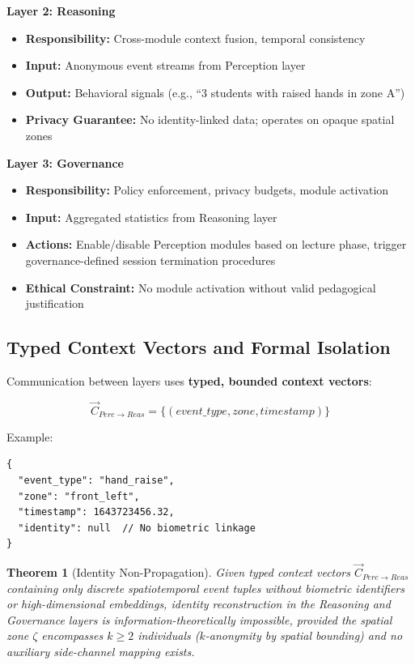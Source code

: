 \documentclass[conference]{IEEEtran}
\newtheorem{theorem}{Theorem}
\begin{document}
\textbf{Layer 2: Reasoning}
\begin{itemize}
    \item \textbf{Responsibility:} Cross-module context fusion, temporal consistency
    \item \textbf{Input:} Anonymous event streams from Perception layer
    \item \textbf{Output:} Behavioral signals (e.g., ``3 students with raised hands in zone A'')
    \item \textbf{Privacy Guarantee:} No identity-linked data; operates on opaque spatial zones
\end{itemize}

\textbf{Layer 3: Governance}
\begin{itemize}
    \item \textbf{Responsibility:} Policy enforcement, privacy budgets, module activation
    \item \textbf{Input:} Aggregated statistics from Reasoning layer
    \item \textbf{Actions:} Enable/disable Perception modules based on lecture phase, trigger governance-defined session termination procedures
    \item \textbf{Ethical Constraint:} No module activation without valid pedagogical justification
\end{itemize}

\subsection{Typed Context Vectors and Formal Isolation}
Communication between layers uses \textbf{typed, bounded context vectors}:

\begin{equation}
\vec{C}_{Perc \to Reas} = \{(event\_type, zone, timestamp)\}
\end{equation}

Example:
\begin{verbatim}
{
  "event_type": "hand_raise",
  "zone": "front_left",
  "timestamp": 1643723456.32,
  "identity": null  // No biometric linkage
}
\end{verbatim}

\begin{theorem}[Identity Non-Propagation]
Given typed context vectors $\vec{C}_{Perc \to Reas}$ containing only discrete spatiotemporal event tuples without biometric identifiers or high-dimensional embeddings, identity reconstruction in the Reasoning and Governance layers is information-theoretically impossible, provided the spatial zone $\zeta$ encompasses $k \ge 2$ individuals ($k$-anonymity by spatial bounding) and no auxiliary side-channel mapping exists.
\end{theorem}
\end{document}
